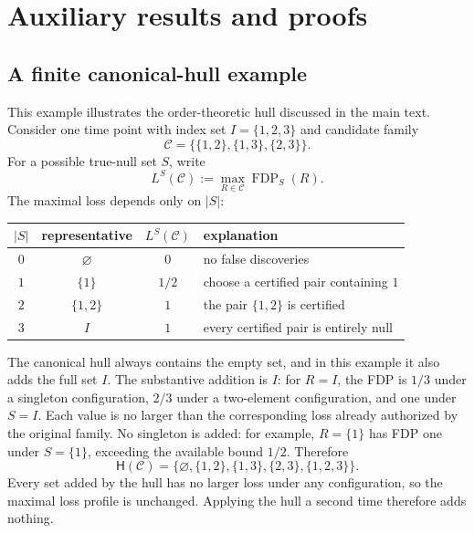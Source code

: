 \documentclass[11pt]{article}
\numberwithin{equation}{section}
\theoremstyle{plain}
\theoremstyle{definition}
\newcommand{\C}{\mathcal C}
\newcommand{\Hh}{\mathsf H}
\newcommand{\FDP}{\operatorname{FDP}}
\newcommand{\loss}{L}
\begin{document}
\section{Auxiliary results and proofs}\label{app:auxiliary}

\subsection{A finite canonical-hull example}\label{sup:finite-example}

This example illustrates the order-theoretic hull discussed in the main text. Consider one time point with index set $I=\{1,2,3\}$ and candidate family
\begin{equation}\label{sup:eq:finite-family}
  \C=\bigl\{\{1,2\},\{1,3\},\{2,3\}\bigr\}.
\end{equation}
For a possible true-null set $S$, write
\[
  \loss^S(\C):=\max_{R\in\C}\FDP_S(R).
\]
The maximal loss depends only on $|S|$:
\begin{center}
\begin{tabular}{@{}cccl@{}}
\toprule
$|S|$ & representative & $\loss^S(\C)$ & explanation \\
\midrule
$0$ & $\varnothing$ & $0$ & no false discoveries \\
$1$ & $\{1\}$ & $1/2$ & choose a certified pair containing $1$ \\
$2$ & $\{1,2\}$ & $1$ & the pair $\{1,2\}$ is certified \\
$3$ & $I$ & $1$ & every certified pair is entirely null \\
\bottomrule
\end{tabular}
\end{center}

The canonical hull always contains the empty set, and in this example it also adds the full set $I$. The substantive addition is $I$: for $R=I$, the FDP is $1/3$ under a singleton configuration, $2/3$ under a two-element configuration, and one under $S=I$. Each value is no larger than the corresponding loss already authorized by the original family. No singleton is added: for example, $R=\{1\}$ has FDP one under $S=\{1\}$, exceeding the available bound $1/2$. Therefore
\begin{equation}\label{sup:eq:finite-hull}
  \Hh(\C)
  =\bigl\{\varnothing,\{1,2\},\{1,3\},\{2,3\},\{1,2,3\}\bigr\}.
\end{equation}
Every set added by the hull has no larger loss under any configuration, so the maximal loss profile is unchanged. Applying the hull a second time therefore adds nothing.
\end{document}
